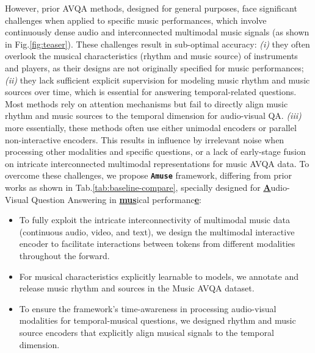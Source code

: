 \documentclass[11pt]{article}
\begin{document}
However, prior AVQA methods, designed for general purposes, face significant challenges when applied to specific music performances, which involve continuously dense audio and interconnected multimodal music signals (as shown in Fig.\ref{fig:teaser}). These challenges result in sub-optimal accuracy:
\textit{{(i)}} they often overlook the musical characteristics (rhythm and music source) of instruments and players, as their designs are not originally specified for music performances;
\textit{{(ii)}} they lack sufficient explicit supervision for modeling music rhythm and music sources over time, which is essential for answering temporal-related questions. Most methods rely on attention mechanisms but fail to directly align music rhythm and music sources to the temporal dimension for audio-visual QA.
\textit{{(iii)}} more essentially, these methods often use either unimodal encoders or parallel non-interactive encoders. This results in influence by irrelevant noise when processing other modalities and specific questions, or a lack of early-stage fusion on intricate interconnected multimodal representations for music AVQA data.
To overcome these challenges, we propose \textbf{\texttt{Amuse}} framework, differing from prior works as shown in Tab.\ref{tab:baseline-compare}, specially designed for \underline{\textbf{A}}udio-{{V}}isual {{Q}}uestion {{A}}nswering in \underline{\textbf{mus}}ical performanc\underline{\textbf{e}}:
\begin{itemize}[leftmargin=*]
\item To fully exploit the intricate interconnectivity of multimodal music data (continuous audio, video, and text), we design the multimodal interactive encoder to facilitate interactions between tokens from different modalities throughout the forward.

\item For musical characteristics explicitly learnable to models, we annotate and release music rhythm and sources in the Music AVQA dataset.

\item To ensure the framework's time-awareness in processing audio-visual modalities for temporal-musical questions, we designed rhythm and music source encoders that explicitly align musical signals to the temporal dimension.
\end{itemize}
\end{document}
